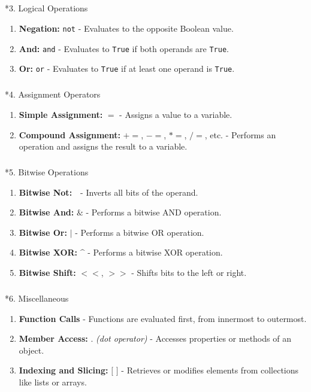 \documentclass[
  letterpaper,
  DIV=11,
  numbers=noendperiod]{scrreprt}
\makeatletter
\let\oldsubparagraph\subparagraph
\renewcommand{\subparagraph}{
    \@ifstar
      \xxxSubParagraphStar
      \xxxSubParagraphNoStar
  }
\newcommand{\xxxSubParagraphStar}[1]{\oldsubparagraph*{#1}\mbox{}}
\newcommand{\xxxSubParagraphNoStar}[1]{\oldsubparagraph{#1}\mbox{}}
\providecommand{\tightlist}{%
  \setlength{\itemsep}{0pt}\setlength{\parskip}{0pt}}
\makeatother
\begin{document}
\begin{tcolorbox}[enhanced jigsaw, colframe=quarto-callout-note-color-frame, toprule=.15mm, bottomrule=.15mm, rightrule=.15mm, colback=white, breakable, arc=.35mm, opacityback=0, left=2mm, leftrule=.75mm]
\subparagraph*{3. Logical Operations}\label{logical-operations}

\begin{enumerate}
\def\labelenumi{\arabic{enumi}.}
\item
  \textbf{Negation:} \texttt{not} - Evaluates to the opposite Boolean
  value.
\item
  \textbf{And:} \texttt{and} - Evaluates to \texttt{True} if both
  operands are \texttt{True}.
\item
  \textbf{Or:} \texttt{or} - Evaluates to \texttt{True} if at least one
  operand is \texttt{True}.
\end{enumerate}

\subparagraph*{4. Assignment Operators}\label{assignment-operators-1}

\begin{enumerate}
\def\labelenumi{\arabic{enumi}.}
\item
  \textbf{Simple Assignment:} \(=\) - Assigns a value to a variable.
\item
  \textbf{Compound Assignment:} \(+=\), \(-=\), \(*=\), \(/=\), etc. -
  Performs an operation and assigns the result to a variable.
\end{enumerate}

\subparagraph*{5. Bitwise Operations}\label{bitwise-operations}

\begin{enumerate}
\def\labelenumi{\arabic{enumi}.}
\item
  \textbf{Bitwise Not:} \(\text{~}\) - Inverts all bits of the operand.
\item
  \textbf{Bitwise And:} \(\text{&}\) - Performs a bitwise AND operation.
\item
  \textbf{Bitwise Or:} \(|\) - Performs a bitwise OR operation.
\item
  \textbf{Bitwise XOR:} \(\text{^}\) - Performs a bitwise XOR operation.
\item
  \textbf{Bitwise Shift:} \(<<\), \(>>\) - Shifts bits to the left or
  right.
\end{enumerate}

\subparagraph*{6. Miscellaneous}\label{miscellaneous}

\begin{enumerate}
\def\labelenumi{\arabic{enumi}.}
\tightlist
\item
  \textbf{Function Calls} - Functions are evaluated first, from
  innermost to outermost.
\item
  \textbf{Member Access:} \(.\) \emph{(dot operator)} - Accesses
  properties or methods of an object.
\item
  \textbf{Indexing and Slicing:} \(\text{[ ]}\) - Retrieves or modifies
  elements from collections like lists or arrays.
\end{enumerate}


\end{tcolorbox}
\end{document}
